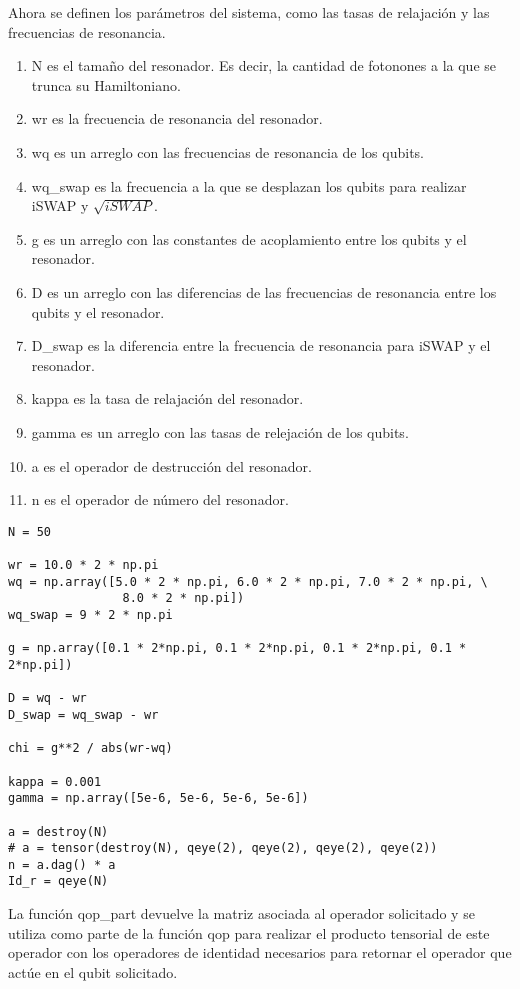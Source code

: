 Ahora se definen los parámetros del sistema, como las tasas de relajación y las frecuencias de resonancia.

\begin{enumerate}
    \item N es el tamaño del resonador. Es decir, la cantidad de fotonones a la que se trunca su Hamiltoniano.
    \item wr es la frecuencia de resonancia del resonador.
    \item wq es un arreglo con las frecuencias de resonancia de los qubits.
    \item wq\_swap es la frecuencia a la que se desplazan los qubits para realizar iSWAP y $\sqrt{iSWAP}$.
    \item g es un arreglo con las constantes de acoplamiento entre los qubits y el resonador.
    \item D es un arreglo con las diferencias de las frecuencias de resonancia entre los qubits y el resonador.
    \item D\_swap es la diferencia entre la frecuencia de resonancia para iSWAP y el resonador.
    \item kappa es la tasa de relajación del resonador.
    \item gamma es un arreglo con las tasas de relejación de los qubits.
    \item a es el operador de destrucción del resonador.
    \item n es el operador de número del resonador.
\end{enumerate}

\begin{verbatim}
N = 50

wr = 10.0 * 2 * np.pi
wq = np.array([5.0 * 2 * np.pi, 6.0 * 2 * np.pi, 7.0 * 2 * np.pi, \
                8.0 * 2 * np.pi])
wq_swap = 9 * 2 * np.pi

g = np.array([0.1 * 2*np.pi, 0.1 * 2*np.pi, 0.1 * 2*np.pi, 0.1 * 2*np.pi])

D = wq - wr
D_swap = wq_swap - wr

chi = g**2 / abs(wr-wq)

kappa = 0.001
gamma = np.array([5e-6, 5e-6, 5e-6, 5e-6])

a = destroy(N)
# a = tensor(destroy(N), qeye(2), qeye(2), qeye(2), qeye(2))
n = a.dag() * a
Id_r = qeye(N)
\end{verbatim}

La función qop\_part devuelve la matriz asociada al operador solicitado y se utiliza como parte de la función qop para realizar el producto tensorial de este operador con los operadores de identidad necesarios para retornar el operador que actúe en el qubit solicitado.

